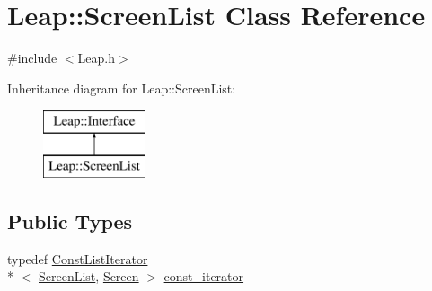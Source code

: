 \hypertarget{class_leap_1_1_screen_list}{\section{Leap\+:\+:Screen\+List Class Reference}
\label{class_leap_1_1_screen_list}
}


{\ttfamily \#include $<$Leap.\+h$>$}

Inheritance diagram for Leap\+:\+:Screen\+List\+:\begin{figure}[H]
\begin{center}
\leavevmode
\includegraphics[height=2.000000cm]{class_leap_1_1_screen_list}
\end{center}
\end{figure}
\subsection*{Public Types}
\begin{DoxyCompactItemize}
\item 
typedef \hyperlink{class_leap_1_1_const_list_iterator}{Const\+List\+Iterator}\\*
$<$ \hyperlink{class_leap_1_1_screen_list}{Screen\+List}, \hyperlink{class_leap_1_1_screen}{Screen} $>$ \hyperlink{class_leap_1_1_screen_list_aa5375d780cb454e661f94096dcefd431}{const\+\_\+iterator}
\end{DoxyCompactItemize}
